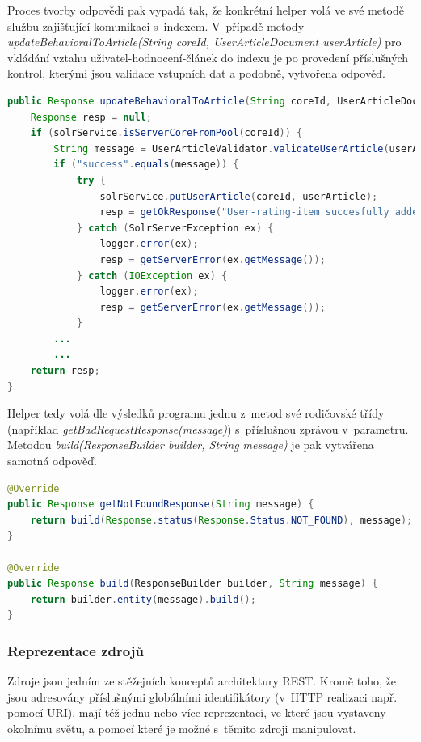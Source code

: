 \documentclass[thesis=M,czech]{FITthesis}[2014/05/07]
\begin{document}
Proces tvorby odpovědi pak vypadá tak, že konkrétní helper volá ve své metodě službu zajišťující komunikaci s~indexem. V~případě metody \emph{updateBehavioralToArticle(String coreId, UserArticleDocument userArticle)} pro vkládání vztahu uživatel-hodnocení-článek do indexu je po provedení příslušných kontrol, kterými jsou validace vstupních dat a podobně, vytvořena odpověď.

\begin{lstlisting}[language=java]
public Response updateBehavioralToArticle(String coreId, UserArticleDocument userArticle) {
    Response resp = null;
    if (solrService.isServerCoreFromPool(coreId)) {
        String message = UserArticleValidator.validateUserArticle(userArticle);
        if ("success".equals(message)) {
            try {
                solrService.putUserArticle(coreId, userArticle);
                resp = getOkResponse("User-rating-item succesfully added into Solr core.");
            } catch (SolrServerException ex) {
                logger.error(ex);
                resp = getServerError(ex.getMessage());
            } catch (IOException ex) {
                logger.error(ex);
                resp = getServerError(ex.getMessage());
            }
		...
		...
    return resp;
}
\end{lstlisting}

Helper tedy volá dle výsledků programu jednu z~metod své rodičovské třídy (například \emph{getBadRequestResponse(message)}) s~příslušnou zprávou v~parametru. Metodou \emph{build(ResponseBuilder builder, String message)} je pak vytvářena samotná odpověď.

\begin{lstlisting}[language=java]
@Override
public Response getNotFoundResponse(String message) {
    return build(Response.status(Response.Status.NOT_FOUND), message);
}    

@Override
public Response build(ResponseBuilder builder, String message) {
    return builder.entity(message).build();
}
\end{lstlisting}

\subsubsection{Reprezentace zdrojů}
\label{subsub:resource}
Zdroje jsou jedním ze stěžejních konceptů architektury REST. Kromě toho, že jsou adresovány příslušnými globálními identifikátory (v~HTTP realizaci např. pomocí URI), mají též jednu nebo více reprezentací, ve které jsou vystaveny okolnímu světu, a pomocí které je možné s~těmito zdroji manipulovat. 
\end{document}
